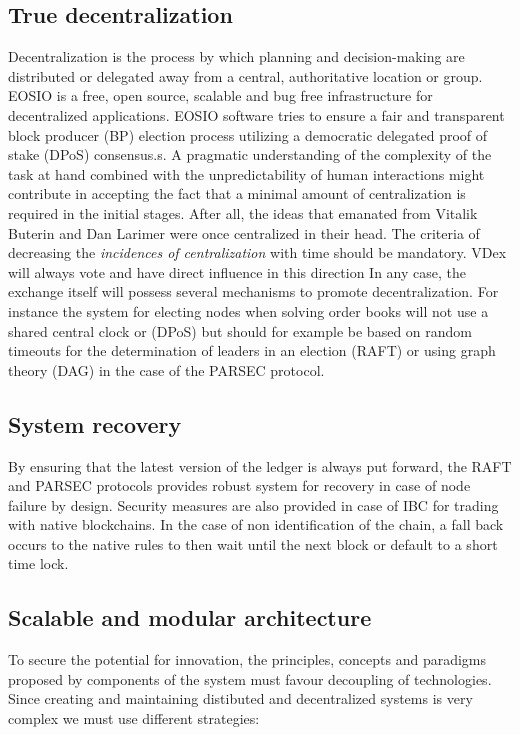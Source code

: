 \documentclass[]{article}
\begin{document}
	\subsection{True decentralization}
	 Decentralization is the process by which planning and decision-making are distributed or delegated away from a central, authoritative location or group.
	 EOSIO is a free, open source, scalable and bug free infrastructure for decentralized applications. EOSIO software tries to ensure a fair and transparent block producer (BP) election process utilizing a democratic delegated proof of stake (DPoS) consensus.s.
	 A pragmatic understanding of the complexity of the task at hand combined with the unpredictability of human interactions might contribute in accepting the fact that a minimal amount of centralization is required in the initial stages.
	 After all, the ideas that emanated from Vitalik Buterin and Dan Larimer were once centralized in their head. The criteria of decreasing the \textit{incidences of centralization} with time should be mandatory. VDex will always vote and have direct influence in this direction  
	 In any case, the exchange itself will possess several mechanisms to promote decentralization. For instance the system for electing nodes when solving order books will not use a shared central clock or (DPoS) but should for example be based on random timeouts for the determination of leaders in an election (RAFT) or using graph theory (DAG) in the case of the PARSEC protocol.
	 
	\subsection{System recovery}
	By ensuring that the latest version of the ledger is always put forward, 
	the RAFT and PARSEC protocols provides robust system for recovery in case of node failure by design.
	Security measures are also provided in case of IBC for trading with native blockchains. In the case of non identification of the chain, a fall back occurs to the native rules to then  wait until the next block or default to a short time lock.
	
	\subsection{Scalable and modular architecture}
	To secure the potential for innovation, the principles, 
	concepts and paradigms proposed by components of the system
	must favour decoupling of technologies. 
	Since creating and maintaining distibuted and decentralized systems
	is very complex we must use different strategies: 
\end{document}
